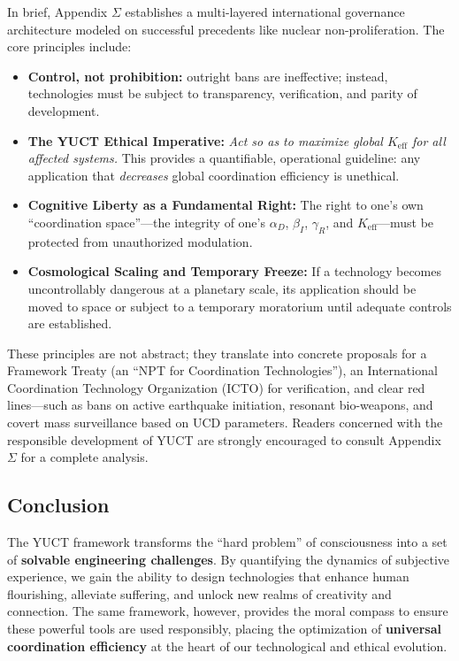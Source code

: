 \documentclass[12pt,a4paper]{article}
\begin{document}
	In brief, Appendix \(\Sigma\) establishes a multi-layered international governance architecture modeled on successful precedents like nuclear non-proliferation. The core principles include:
	\begin{itemize}
		\item \textbf{Control, not prohibition:} outright bans are ineffective; instead, technologies must be subject to transparency, verification, and parity of development.
		\item \textbf{The YUCT Ethical Imperative:} \textit{Act so as to maximize global \(K_{\mathrm{eff}}\) for all affected systems.} This provides a quantifiable, operational guideline: any application that \textit{decreases} global coordination efficiency is unethical.
		\item \textbf{Cognitive Liberty as a Fundamental Right:} The right to one's own ``coordination space''—the integrity of one's \(\alpha_D\), \(\beta_I\), \(\gamma_R\), and \(K_{\mathrm{eff}}\)—must be protected from unauthorized modulation.
		\item \textbf{Cosmological Scaling and Temporary Freeze:} If a technology becomes uncontrollably dangerous at a planetary scale, its application should be moved to space or subject to a temporary moratorium until adequate controls are established.
	\end{itemize}
	
	These principles are not abstract; they translate into concrete proposals for a Framework Treaty (an ``NPT for Coordination Technologies''), an International Coordination Technology Organization (ICTO) for verification, and clear red lines—such as bans on active earthquake initiation, resonant bio-weapons, and covert mass surveillance based on UCD parameters. Readers concerned with the responsible development of YUCT are strongly encouraged to consult Appendix \(\Sigma\) for a complete analysis.
	
	\subsection{Conclusion}
	The YUCT framework transforms the ``hard problem'' of consciousness into a set of \textbf{solvable engineering challenges}. By quantifying the dynamics of subjective experience, we gain the ability to design technologies that enhance human flourishing, alleviate suffering, and unlock new realms of creativity and connection. The same framework, however, provides the moral compass to ensure these powerful tools are used responsibly, placing the optimization of \textbf{universal coordination efficiency} at the heart of our technological and ethical evolution.
	
\end{document}
